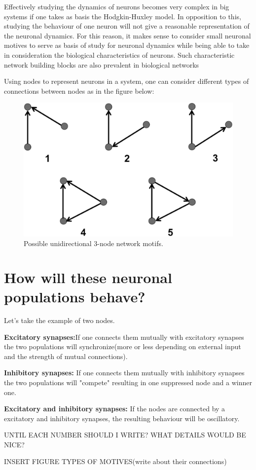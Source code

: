 \documentclass[class={myRUCProject}, crop=false]{standalone}
\begin{document}
\indent Effectively studying the dynamics of neurons becomes very complex in big systems if one takes as basis the Hodgkin-Huxley model. In opposition to this, studying the behaviour of one neuron will not give a reasonable representation of the neuronal dynamics. For this reason, it makes sense to consider small neuronal motives to serve as basis of study for neuronal dynamics while being able to take in consideration the biological characteristics of neurons. Such characteristic network building blocks are also prevalent in biological networks \cite{Sporns2004}

\indent Using nodes to represent neurons in a system, one can consider different types of connections between nodes as in the figure below:


\begin{figure}[h!]
    \centering
    \includegraphics[width=200 pt]{Pictures/Ana/Motif.png}
    \caption{ Possible unidirectional 3-node network motifs. \cite{Shadizadeh2022}}
    \label{fig:enter-label}
\end{figure}

\section{How will these neuronal populations behave?}

Let's take the example of two nodes. \newline

\textbf{Excitatory synapses:}If one connects them mutually with excitatory synapses the two populations will synchronize(more or less depending on external input and the strength of mutual connections).

\textbf{Inhibitory synapses:} If one connects them mutually with inhibitory synapses the two populations will "compete" resulting in one suppressed node and a winner one.

\textbf{Excitatory and inhibitory synapses:} If the nodes are connected by a excitatory and inhibitory synapses, the resulting behaviour will be oscillatory.

UNTIL EACH NUMBER SHOULD I WRITE? WHAT DETAILS WOULD BE NICE?

INSERT FIGURE
TYPES OF MOTIVES(write about their connections)
\end{document}
